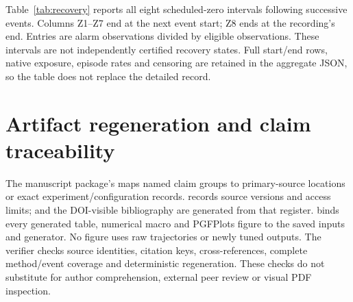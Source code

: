 Table~\ref{tab:recovery} reports all eight scheduled-zero intervals following successive events. Columns Z1--Z7 end at the next event start; Z8 ends at the recording's end. Entries are alarm observations divided by eligible observations. These intervals are not independently certified recovery states. Full start/end rows, native exposure, episode rates and censoring are retained in the aggregate JSON, so the table does not replace the detailed record.
\begin{table}[htbp]\centering\scriptsize
\caption{All scheduled-zero intervals: alarm points / eligible points.}\label{tab:recovery}
\resizebox{\textwidth}{!}{}
\end{table}

\section{Artifact regeneration and claim traceability}
\label{app:package}
The manuscript package's  maps named claim groups to primary-source locations or exact experiment/configuration records.  records source versions and access limits;  and the DOI-visible bibliography are generated from that register.  binds every generated table, numerical macro and PGFPlots figure to the saved inputs and generator. No figure uses raw trajectories or newly tuned outputs. The verifier checks source identities, citation keys, cross-references, complete method/event coverage and deterministic regeneration. These checks do not substitute for author comprehension, external peer review or visual PDF inspection.

